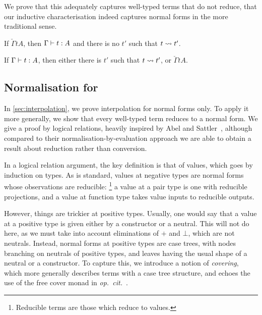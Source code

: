 \documentclass[a4paper,UKenglish,cleveref, autoref, thm-restate]{lipics-v2021}
\begin{document}
We prove that this adequately captures well-typed terms that do not reduce,
\ie that our inductive characterisation indeed captures normal forms in the
more traditional sense.

\begin{lemma}
  If \(\check{\Gamma}{t}{A}\), then \(\typing{\Gamma}{t}[A]\)
  and there is no \(t'\) such that \(t \rightsquigarrow t'\).
\end{lemma}

\begin{theorem}
  If \(\typing{\Gamma}{t}[A]\), then either there is \(t'\) such that
  \(t \rightsquigarrow t'\), or \(\check{\Gamma}{t}{A}\).
\end{theorem}

\subsection[Normalisation for STLCp]{Normalisation for \stlcp}

In \cref{sec:interpolation}, we prove interpolation for normal forms only.
To apply it more generally, we show that every well-typed term
reduces to a normal form. %
We give a proof by
logical relations, heavily inspired by Abel and Sattler~\cite{Abel2019a},
although compared to their normalisation-by-evaluation approach we are able to
obtain a result about reduction rather than conversion.


In a logical relation argument, the key definition is that of values,
which goes by induction on types.
As is standard, values at negative
types are normal forms whose observations are reducible:%
\footnote{Reducible terms are those which reduce to values.}
a value at a pair type is one with reducible projections, and a value
at function type takes value inputs to reducible outputs.

However, things are trickier at positive types. Usually, one
would say that a value at a positive type is given either by a constructor
or a neutral. This will not do here, as we must take into account eliminations
of \(+\) and \(\bot\), which are not neutrals. Instead, normal forms at positive
types are case trees, with nodes branching on neutrals of positive
types, and leaves having the usual shape of a neutral or a constructor.
To capture this, we introduce a notion of \emph{covering}, which
more generally describes terms with a case tree structure, and
echoes the use of the free cover monad in \textit{op.\ cit.}~\cite{Abel2019a}.
\end{document}
